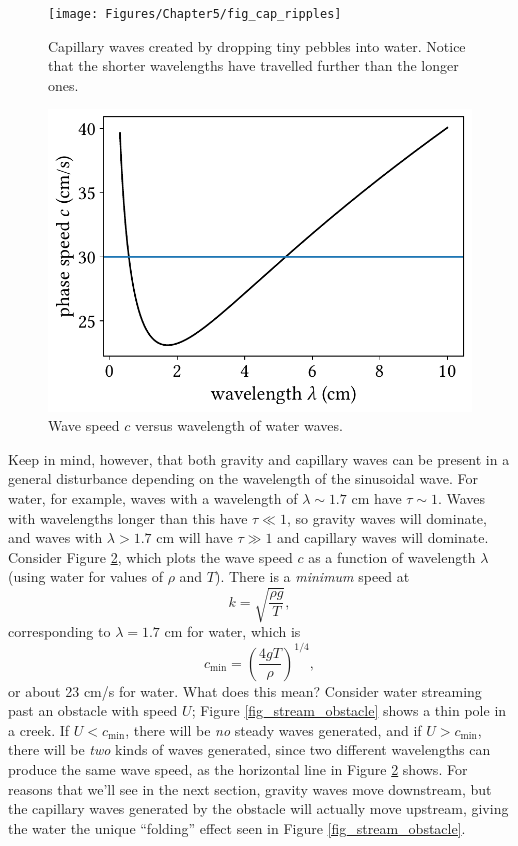 \begin{figure}
\centering\texttt{[image: Figures/Chapter5/fig\_cap\_ripples]}
\caption{Capillary waves created by dropping tiny pebbles into water.  Notice that the shorter wavelengths have travelled further than the longer ones.}
\label{fig_cap_ripples}
\end{figure}


\begin{figure}
\centering\includegraphics[width=0.7\linewidth]{Figures/Chapter5/fig_grav_and_cap}
\caption{Wave speed $c$ versus wavelength of water waves.}
\label{fig_grav_and_cap}
\end{figure}


Keep in mind, however, that both gravity and capillary waves can be present in a general disturbance depending on the wavelength of the sinusoidal wave.  For water, for example, waves with a wavelength of $\lambda \sim 1.7$ cm have $\tau \sim 1$.  Waves with wavelengths longer than this have $\tau \ll 1$, so gravity waves will dominate, and waves with $\lambda > 1.7$ cm will have $\tau \gg 1$ and capillary waves will dominate.  Consider Figure \ref{fig_grav_and_cap}, which plots the wave speed $c$ as a function of wavelength $\lambda$ (using water for values of $\rho$ and $T$).  There is a \emph{minimum} speed at
\[
k = \sqrt{\frac{\rho g}{T}},
\]
corresponding to $\lambda = 1.7$ cm for water, which is
\begin{equation}
c_\text{min} = \left( \frac{4gT}{\rho} \right)^{1/4},
\end{equation}
or about 23 cm/s for water.  What does this mean?  Consider water streaming past an obstacle with speed $U$; Figure \ref{fig_stream_obstacle} shows a thin pole in a creek.  If $U < c_\text{min}$, there will be \emph{no} steady waves generated, and if $U > c_\text{min}$, there will be \emph{two} kinds of waves generated, since two different wavelengths can produce the same wave speed, as the horizontal line in Figure \ref{fig_grav_and_cap} shows.  For reasons that we'll see in the next section, gravity waves move downstream, but the capillary waves generated by the obstacle will actually move upstream, giving the water the unique ``folding'' effect seen in Figure \ref{fig_stream_obstacle}.

